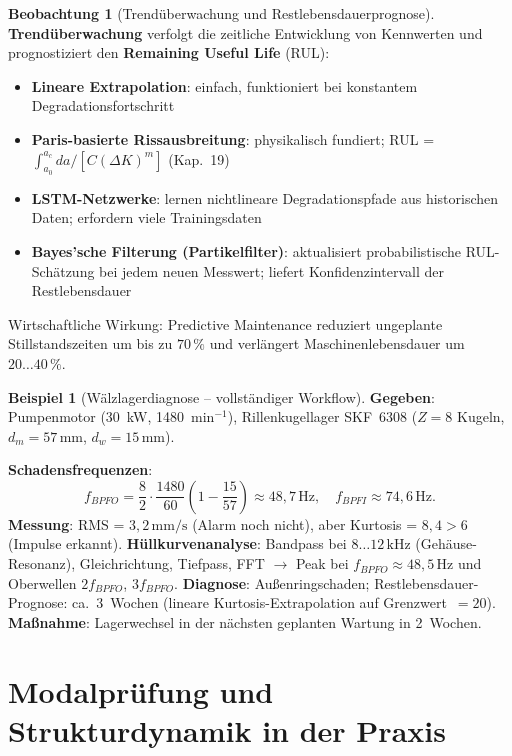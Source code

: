 ﻿\documentclass[a4paper,12pt]{report}
\theoremstyle{definition}
\newtheorem{beispiel}{Beispiel}
\newtheorem{beobachtung}{Beobachtung}
\begin{document}
\begin{beobachtung}[Trendüberwachung und Restlebensdauerprognose]
\textbf{Trendüberwachung} verfolgt die zeitliche Entwicklung von Kennwerten
und prognostiziert den \textbf{Remaining Useful Life} (RUL):
\begin{itemize}
    \item[-] \textbf{Lineare Extrapolation}: einfach, funktioniert bei
          konstantem Degradationsfortschritt
    \item[-] \textbf{Paris-basierte Rissausbreitung}: physikalisch fundiert;
          RUL = $\int_{a_0}^{a_c} da / [C(\Delta K)^m]$ (Kap.~19)
    \item[-] \textbf{LSTM-Netzwerke}: lernen nichtlineare Degradationspfade
          aus historischen Daten; erfordern viele Trainingsdaten
    \item[-] \textbf{Bayes'sche Filterung (Partikelfilter)}: aktualisiert
          probabilistische RUL-Schätzung bei jedem neuen Messwert;
          liefert Konfidenzintervall der Restlebensdauer
\end{itemize}
Wirtschaftliche Wirkung: Predictive Maintenance reduziert ungeplante
Stillstandszeiten um bis zu $70\,\%$ und verlängert Maschinenlebensdauer
um $20\ldots40\,\%$.
\end{beobachtung}

\begin{beispiel}[Wälzlagerdiagnose -- vollständiger Workflow]
\textbf{Gegeben}: Pumpenmotor (30~kW, 1480~min$^{-1}$), Rillenkugellager SKF~6308
($Z=8$ Kugeln, $d_m = 57\,\mathrm{mm}$, $d_w = 15\,\mathrm{mm}$).

\noindent\textbf{Schadensfrequenzen}:
\[
  f_{BPFO} = \frac{8}{2}\cdot\frac{1480}{60}\left(1 - \frac{15}{57}\right) \approx 48{,}7\,\mathrm{Hz},
  \quad f_{BPFI} \approx 74{,}6\,\mathrm{Hz}.
\]
\textbf{Messung}: RMS = $3{,}2\,\mathrm{mm/s}$ (Alarm noch nicht), aber
Kurtosis = $8{,}4 > 6$ (Impulse erkannt).
\textbf{Hüllkurvenanalyse}: Bandpass bei $8\ldots12\,\mathrm{kHz}$ (Gehäuse-Resonanz),
Gleichrichtung, Tiefpass, FFT $\to$ Peak bei $f_{BPFO} \approx 48{,}5\,\mathrm{Hz}$
und Oberwellen $2f_{BPFO}$, $3f_{BPFO}$.
\textbf{Diagnose}: Außenringschaden; Restlebensdauer-Prognose: ca.\ 3~Wochen
(lineare Kurtosis-Extrapolation auf Grenzwert~$= 20$).
\textbf{Maßnahme}: Lagerwechsel in der nächsten geplanten Wartung in 2~Wochen.
\end{beispiel}

\section{Modalprüfung und Strukturdynamik in der Praxis}
\end{document}
